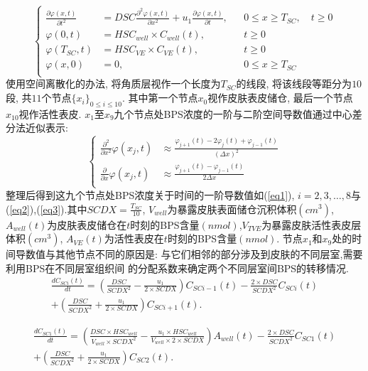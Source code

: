 \documentclass[a4paper,punct=banjiao,twoside]{ctexrep}
\theoremstyle{plain}
\theoremstyle{definition}
\theoremstyle{remark}
\begin{document}
\begin{equation}\label{eq0}
  \left\{\begin{aligned}
    \frac{\partial \varphi(x,t) }{\partial t^2} &= DSC \frac{\partial^2 \varphi(x,t)}{\partial x^2} + u_1 \frac{\partial \varphi(x,t)}{\partial t}, && 0\leq x \geq T_{SC}, \quad t\geq 0\\
    \varphi(0,t) &= HSC_{well} \times C_{well}(t), &&t\geq 0\\
    \varphi(T_{SC},t) &= HSC_{VE} \times C_{VE}(t), &&t\geq 0\\
    \varphi(x,0) &= 0, &&0\leq x \geq T_{SC}\\
  \end{aligned}\right.
  \end{equation}
\noindent 使用空间离散化的办法, 将角质层视作一个长度为$T_{SC}$的线段, 将该线段等距分为$10$段, 共$11$个节点$\{x_i\}_{0\leq i\leq 10}$. 其中第一个节点$x_0$视作皮肤表皮储仓, 最后一个节点$x_{10}$视作活性表皮.
$x_1$至$x_9$九个节点处BPS浓度的一阶与二阶空间导数值通过中心差分法近似表示: 
\begin{equation}\label{eq1.1}
  \left\{\begin{aligned}
    \frac{\partial^2}{\partial x^2}\varphi(x_j, t) &\approx \frac{\varphi_{j+1}(t) - 2\varphi_j(t) + \varphi_{j-1}(t)}{(\Delta x)^2}\\
    \frac{\partial}{\partial x}\varphi(x_j, t) &\approx \frac{\varphi_{j+1}(t) - \varphi_{j-1}(t)}{2\Delta x}\\
  \end{aligned}\right.
  \end{equation}
  \noindent 整理后得到这九个节点处BPS浓度关于时间的一阶导数值如(\ref{eq1}), $i=2,3,\dots,8$与(\ref{eq2}),(\ref{eq3}).其中$SCDX = \frac{T_{SC}}{10}$, 
  $V_{well}$为暴露皮肤表面储仓沉积体积$(cm^3)$, $A_{well}(t)$为皮肤表皮储仓在$t$时刻的BPS含量$(nmol)$,$V_{TVE}$为暴露皮肤活性表皮层体积$(cm^3)$, $A_{VE}(t)$为活性表皮在$t$时刻的BPS含量$(nmol)$.
  节点$x_1$和$x_9$处的时间导数值与其他节点不同的原因是: 与它们相邻的部分涉及到皮肤的不同层室,需要利用BPS在不同层室组织间
  的分配系数来确定两个不同层室间BPS的转移情况. 
\begin{multline}\label{eq1}
  \frac{dC_{SCi}(t)}{dt}=\left(\frac{DSC}{SCDX^2} -\frac{u_1}{2 \times  SCDX}\right)C_{SCi-1}(t)-\frac{2 \times DSC}{SCDX^2}  C_{SCi}(t)\\
  +\left(\frac{DSC}{SCDX^2}+\frac{u_1}{2 \times  SCDX}\right)C_{SCi+1}(t).
\end{multline}

\begin{multline}\label{eq2}
  \frac{dC_{SC1}(t)}{dt}=\left(\frac{DSC \times  HSC_{well}}{V_{well}  \times  SCDX^2 }-\frac{u_1  \times  HSC_{well}}{V_{well}  \times  2 \times  SCDX}\right)A_{well}(t)   -\frac{2 \times DSC}{SCDX^2}  C_{SC1}(t)\\
  +\left(\frac{DSC}{SCDX^2}+\frac{u_1}{2 \times  SCDX}\right)C_{SC2}(t).
\end{multline}
\end{document}
